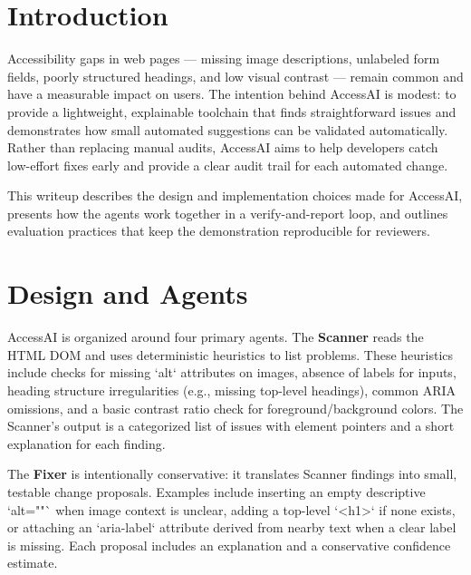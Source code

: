 \documentclass[10pt,twocolumn]{article}
\author{Student Project}
\date{}
\begin{document}
\maketitle

\begin{abstract}
AccessAI is a compact, reproducible system that demonstrates how a set of small agents can detect simple but high-impact accessibility issues in HTML pages and propose conservative, explainable fixes. The implementation prioritizes transparency and reproducibility: it runs locally without cloud API keys, uses deterministic heuristics, and verifies suggested edits with a re-scan.
\end{abstract}

\section{Introduction}
Accessibility gaps in web pages — missing image descriptions, unlabeled form fields, poorly structured headings, and low visual contrast — remain common and have a measurable impact on users. The intention behind AccessAI is modest: to provide a lightweight, explainable toolchain that finds straightforward issues and demonstrates how small automated suggestions can be validated automatically. Rather than replacing manual audits, AccessAI aims to help developers catch low-effort fixes early and provide a clear audit trail for each automated change.

This writeup describes the design and implementation choices made for AccessAI, presents how the agents work together in a verify-and-report loop, and outlines evaluation practices that keep the demonstration reproducible for reviewers.

\section{Design and Agents}
AccessAI is organized around four primary agents. The \textbf{Scanner} reads the HTML DOM and uses deterministic heuristics to list problems. These heuristics include checks for missing `alt` attributes on images, absence of labels for inputs, heading structure irregularities (e.g., missing top-level headings), common ARIA omissions, and a basic contrast ratio check for foreground/background colors. The Scanner's output is a categorized list of issues with element pointers and a short explanation for each finding.

The \textbf{Fixer} is intentionally conservative: it translates Scanner findings into small, testable change proposals. Examples include inserting an empty descriptive `alt=""` when image context is unclear, adding a top-level `<h1>` if none exists, or attaching an `aria-label` attribute derived from nearby text when a clear label is missing. Each proposal includes an explanation and a conservative confidence estimate.
\end{document}
